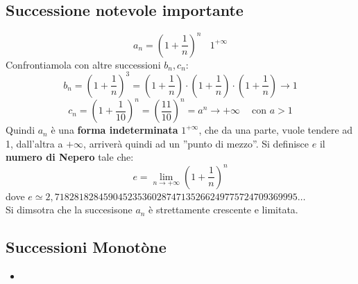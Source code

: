 \documentclass{article}
\begin{document}
\subsection{Successione notevole importante}
\[
    a_n = (1+\dfrac{1}{n})^n \ \ \ \ 1^{+\infty}
\]
Confrontiamola con altre successioni $b_n, c_n$:
\[
    b_n = (1+\dfrac{1}{n})^3 = (1+\dfrac{1}{n})\cdot(1+\dfrac{1}{n})\cdot(1+\dfrac{1}{n})\to 1
\]
\[
    c_n = (1+\dfrac{1}{10})^n = (\dfrac{11}{10})^n = a^n \to +\infty \ \ \ \ \text{ con } a > 1
\]
Quindi $a_n$ è una \textbf{forma indeterminata} $1^{+\infty}$, che da una
parte, vuole tendere ad 1, dall'altra a $+\infty$, arriverà quindi ad un
''punto di mezzo''. Si definisce $e$ il \textbf{numero di Nepero} tale che:
\[
    e = \lim_{n\to+\infty}(1+\dfrac{1}{n})^n
\]
dove $e \simeq 2,71828182845904523536028747135266249775724709369995\ldots$\\ Si
dimsotra che la succesisone $a_n$ è strettamente crescente e limitata.

\subsection{Successioni Monotòne}
\begin{itemize}
    \item
\end{itemize}
\end{document}
